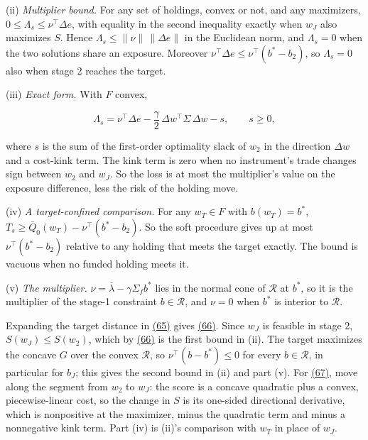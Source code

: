 \documentclass[11pt]{article}
\begin{document}
(ii) \emph{Multiplier bound.} For any set of holdings, convex or not,
and any maximizers,
\(0\leq\Lambda_s\leq\nu^\top\Delta e\), with equality in the
second inequality exactly when \(w_J\) also maximizes \(S\). Hence
\(\Lambda_s\leq\|\nu\|\,\|\Delta e\|\) in the Euclidean norm, and
\(\Lambda_s=0\) when the two solutions share an exposure. Moreover
\(\nu^\top\Delta e\leq\nu^\top(b^*-b_2)\), so \(\Lambda_s=0\) also
when stage 2 reaches the target.

(iii) \emph{Exact form.} With \(F\) convex,

\begin{equation*}
\Lambda_s=\nu^\top\Delta e-\frac\gamma2\,\Delta w^\top\Sigma\,\Delta w-s,
\qquad s\geq0,\tag{67}\label{eq:67}
\end{equation*}

where \(s\) is the sum of the first-order optimality slack of
\(w_2\) in the direction \(\Delta w\) and a cost-kink term. The
kink term is zero when no instrument's trade changes sign between
\(w_2\) and \(w_J\). So the loss is at most the multiplier's value
on the exposure difference, less the risk of the holding move.

(iv) \emph{A target-confined comparison.} For any \(w_T\in F\) with
\(b(w_T)=b^*\),
\(T_s\geq\bar Q_0(w_T)-\nu^\top(b^*-b_2)\). So the soft procedure
gives up at most \(\nu^\top(b^*-b_2)\) relative to any holding that
meets the target exactly. The bound is vacuous when no funded
holding meets it.

(v) \emph{The multiplier.} \(\nu=\bar\lambda-\gamma\Sigma_fb^*\) lies in
the normal cone of \(\mathcal R\) at \(b^*\), so it is the
multiplier of the stage-1 constraint \(b\in\mathcal R\), and
\(\nu=0\) when \(b^*\) is interior to \(\mathcal R\).

Expanding the target distance in \hyperref[eq:65]{(65)} gives \hyperref[eq:66]{(66)}. Since \(w_J\) is
feasible in stage 2, \(S(w_J)\leq S(w_2)\), which by \hyperref[eq:66]{(66)} is the
first bound in (ii). The target maximizes the concave \(G\) over
the convex \(\mathcal R\), so \(\nu^\top(b-b^*)\leq0\) for every
\(b\in\mathcal R\), in particular for \(b_J\); this gives the
second bound in (ii) and part (v). For \hyperref[eq:67]{(67)}, move along the
segment from \(w_2\) to \(w_J\): the score is a concave quadratic
plus a convex, piecewise-linear cost, so the change in \(S\) is its
one-sided directional derivative, which is nonpositive at the
maximizer, minus the quadratic term and minus a nonnegative kink
term. Part (iv) is (ii)'s comparison with \(w_T\) in place of
\(w_J\).
\end{document}
